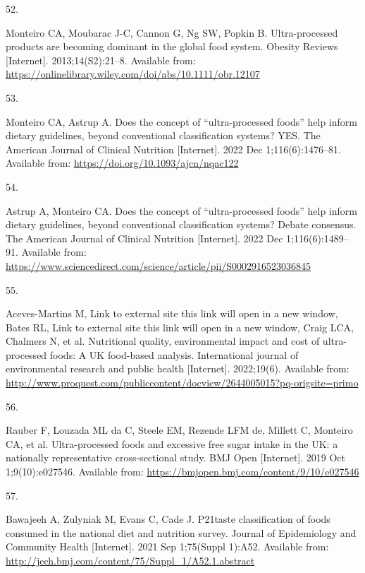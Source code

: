 \documentclass[
]{article}
\newlength{\cslhangindent}
\newlength{\csllabelwidth}
\newlength{\cslentryspacingunit} %
\newenvironment{CSLReferences}[2] %
 {%
  \setlength{\parindent}{0pt}
  \ifodd #1
  \let\oldpar\par
  \def\par{\hangindent=\cslhangindent\oldpar}
  \fi
  \setlength{\parskip}{#2\cslentryspacingunit}
 }%
 {}
\newcommand{\CSLLeftMargin}[1]{\parbox[t]{\csllabelwidth}{#1}}
\newcommand{\CSLRightInline}[1]{\parbox[t]{\linewidth - \csllabelwidth}{#1}\break}
\begin{document}
\begin{CSLReferences}{0}{0}
\leavevmode{}%
\CSLLeftMargin{52. }%
\CSLRightInline{Monteiro CA, Moubarac J-C, Cannon G, Ng SW, Popkin B.
Ultra-processed products are becoming dominant in the global food
system. Obesity Reviews {[}Internet{]}. 2013;14(S2):21--8. Available
from: \url{https://onlinelibrary.wiley.com/doi/abs/10.1111/obr.12107}}

\leavevmode{}%
\CSLLeftMargin{53. }%
\CSLRightInline{Monteiro CA, Astrup A. Does the concept of
{``}ultra-processed foods{''} help inform dietary guidelines, beyond
conventional classification systems? YES. The American Journal of
Clinical Nutrition {[}Internet{]}. 2022 Dec 1;116(6):1476--81. Available
from: \url{https://doi.org/10.1093/ajcn/nqac122}}

\leavevmode{}%
\CSLLeftMargin{54. }%
\CSLRightInline{Astrup A, Monteiro CA. Does the concept of
{``}ultra-processed foods{''} help inform dietary guidelines, beyond
conventional classification systems? Debate consensus. The American
Journal of Clinical Nutrition {[}Internet{]}. 2022 Dec
1;116(6):1489--91. Available from:
\url{https://www.sciencedirect.com/science/article/pii/S0002916523036845}}

\leavevmode{}%
\CSLLeftMargin{55. }%
\CSLRightInline{Aceves-Martins M, Link to external site this link will
open in a new window, Bates RL, Link to external site this link will
open in a new window, Craig LCA, Chalmers N, et al. Nutritional quality,
environmental impact and cost of ultra-processed foods: A UK food-based
analysis. International journal of environmental research and public
health {[}Internet{]}. 2022;19(6). Available from:
\url{http://www.proquest.com/publiccontent/docview/2644005015?pq-origsite=primo}}

\leavevmode{}%
\CSLLeftMargin{56. }%
\CSLRightInline{Rauber F, Louzada ML da C, Steele EM, Rezende LFM de,
Millett C, Monteiro CA, et al. Ultra-processed foods and excessive free
sugar intake in the UK: a nationally representative cross-sectional
study. BMJ Open {[}Internet{]}. 2019 Oct 1;9(10):e027546. Available
from: \url{https://bmjopen.bmj.com/content/9/10/e027546}}

\leavevmode{}%
\CSLLeftMargin{57. }%
\CSLRightInline{Bawajeeh A, Zulyniak M, Evans C, Cade J.
P21{\hspace{0.25em}}taste classification of foods consumed in the
national diet and nutrition survey. Journal of Epidemiology and
Community Health {[}Internet{]}. 2021 Sep 1;75(Suppl 1):A52. Available
from: \url{http://jech.bmj.com/content/75/Suppl_1/A52.1.abstract}}


\end{CSLReferences}
\end{document}
